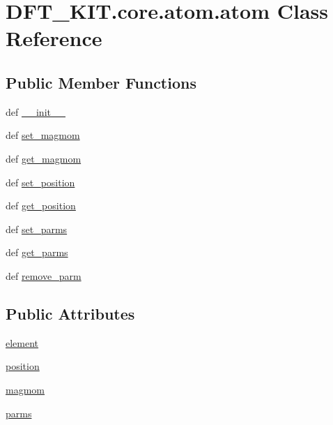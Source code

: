 \hypertarget{class_d_f_t___k_i_t_1_1core_1_1atom_1_1atom}{\section{D\+F\+T\+\_\+\+K\+I\+T.\+core.\+atom.\+atom Class Reference}
\label{class_d_f_t___k_i_t_1_1core_1_1atom_1_1atom}
}
\subsection*{Public Member Functions}
\begin{DoxyCompactItemize}
\item 
def \hyperlink{class_d_f_t___k_i_t_1_1core_1_1atom_1_1atom_a009c3a74d021cdaa211462bfe264e391}{\+\_\+\+\_\+init\+\_\+\+\_\+}
\item 
def \hyperlink{class_d_f_t___k_i_t_1_1core_1_1atom_1_1atom_a8ceaae389e5072b56b412ef183fd252a}{set\+\_\+magmom}
\item 
def \hyperlink{class_d_f_t___k_i_t_1_1core_1_1atom_1_1atom_ac7edf3f236f2f9e63b3ff72200a49458}{get\+\_\+magmom}
\item 
def \hyperlink{class_d_f_t___k_i_t_1_1core_1_1atom_1_1atom_ae43e598eb4fab99c80df3f3228a5687b}{set\+\_\+position}
\item 
def \hyperlink{class_d_f_t___k_i_t_1_1core_1_1atom_1_1atom_a3fd84add462bb189e9fbb08af3ee73e0}{get\+\_\+position}
\item 
def \hyperlink{class_d_f_t___k_i_t_1_1core_1_1atom_1_1atom_ae6d304a50d01a547c245f6704bed631c}{set\+\_\+parms}
\item 
def \hyperlink{class_d_f_t___k_i_t_1_1core_1_1atom_1_1atom_a8bdb87d4538334de54e57ba8ca05a77c}{get\+\_\+parms}
\item 
def \hyperlink{class_d_f_t___k_i_t_1_1core_1_1atom_1_1atom_a37f68a3051eaa205d8cc5dffc689908c}{remove\+\_\+parm}
\end{DoxyCompactItemize}
\subsection*{Public Attributes}
\begin{DoxyCompactItemize}
\item 
\hyperlink{class_d_f_t___k_i_t_1_1core_1_1atom_1_1atom_a816b1396ea4ca88a59a76983227859b6}{element}
\item 
\hyperlink{class_d_f_t___k_i_t_1_1core_1_1atom_1_1atom_aef47619bab2c82e9ed3b3c4faefde38b}{position}
\item 
\hyperlink{class_d_f_t___k_i_t_1_1core_1_1atom_1_1atom_a60468fdb9054f8921592ffd376e5273e}{magmom}
\item 
\hyperlink{class_d_f_t___k_i_t_1_1core_1_1atom_1_1atom_aa864e96171a072d68ca20e3fcd8665dc}{parms}
\end{DoxyCompactItemize}


